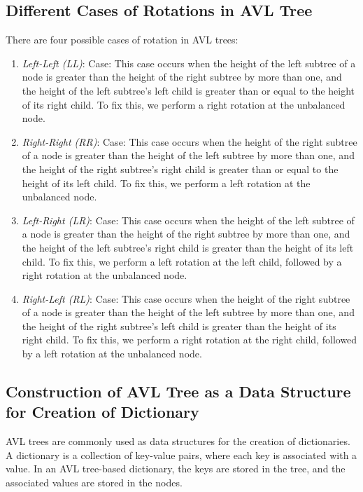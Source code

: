 \documentclass[11pt]{article}
\begin{document}
\subsection{Different Cases of Rotations in AVL Tree}

There are four possible cases of rotation in AVL trees:
\begin{enumerate}
    \item \textit{Left-Left (LL)}:  Case: This case occurs when the height of the left subtree of a node is greater than the height of the right subtree by more than one, and the height of the left subtree's left child is greater than or equal to the height of its right child. To fix this, we perform a right rotation at the unbalanced node.
    \item \textit{Right-Right (RR)}:  Case: This case occurs when the height of the right subtree of a node is greater than the height of the left subtree by more than one, and the height of the right subtree's right child is greater than or equal to the height of its left child. To fix this, we perform a left rotation at the unbalanced node.
    \item \textit{Left-Right (LR)}:  Case: This case occurs when the height of the left subtree of a node is greater than the height of the right subtree by more than one, and the height of the left subtree's right child is greater than the height of its left child. To fix this, we perform a left rotation at the left child, followed by a right rotation at the unbalanced node.
    \item \textit{Right-Left (RL)}:  Case: This case occurs when the height of the right subtree of a node is greater than the height of the left subtree by more than one, and the height of the right subtree's left child is greater than the height of its right child. To fix this, we perform a right rotation at the right child, followed by a left rotation at the unbalanced node.

\end{enumerate}
\subsection{Construction of AVL Tree as a Data Structure for Creation of Dictionary}

AVL trees are commonly used as data structures for the creation of dictionaries. A dictionary is a collection of key-value pairs, where each key is associated with a value. In an AVL tree-based dictionary, the keys are stored in the tree, and the associated values are stored in the nodes.\\
\end{document}
